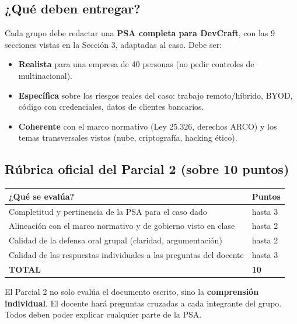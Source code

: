 \documentclass[12pt,a4paper]{article}
\renewcommand{\arraystretch}{1.25}
\begin{document}
\subsection{¿Qu\'e deben entregar?}

Cada grupo debe redactar una \textbf{PSA completa para DevCraft}, con las 9 secciones vistas en la Secci\'on 3, adaptadas al caso. Debe ser:
\begin{itemize}[leftmargin=2em]
    \item \textbf{Realista} para una empresa de 40 personas (no pedir controles de multinacional).
    \item \textbf{Espec\'ifica} sobre los riesgos reales del caso: trabajo remoto/h\'ibrido, BYOD, c\'odigo con credenciales, datos de clientes bancarios.
    \item \textbf{Coherente} con el marco normativo (Ley 25.326, derechos ARCO) y los temas transversales vistos (nube, criptograf\'ia, hacking \'etico).
\end{itemize}

\newpage
\subsection{R\'ubrica oficial del Parcial 2 (sobre 10 puntos)}

\renewcommand{\arraystretch}{1.5}
\begin{tabularx}{\textwidth}{|X|>{\centering\arraybackslash}p{3cm}|}
\hline
\rowcolor{violetaParcial!20}
\textbf{¿Qu\'e se eval\'ua?} & \textbf{Puntos} \\
\hline
Completitud y pertinencia de la PSA para el caso dado & hasta 3 \\
\hline
Alineaci\'on con el marco normativo y de gobierno visto en clase & hasta 2 \\
\hline
Calidad de la defensa oral grupal (claridad, argumentaci\'on) & hasta 2 \\
\hline
Calidad de las respuestas individuales a las preguntas del docente & hasta 3 \\
\hline
\rowcolor{grisClaro}
\textbf{TOTAL} & \textbf{10} \\
\hline
\end{tabularx}

\begin{cajaNota}[title={Atenci\'on: las preguntas individuales valen 30\%}]
El Parcial 2 no solo eval\'ua el documento escrito, sino la \textbf{comprensi\'on individual}. El docente har\'a preguntas cruzadas a cada integrante del grupo. Todos deben poder explicar cualquier parte de la PSA.
\end{cajaNota}
\end{document}
